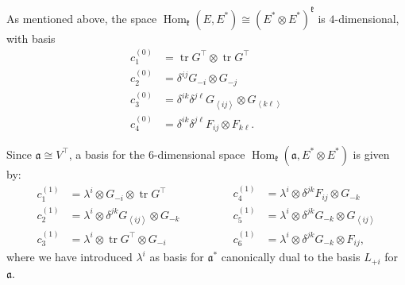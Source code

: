 \documentclass[11pt,reqno,a4paper,final]{amsart}
\theoremstyle{plain}
\theoremstyle{definition}
\newcommand{\fa}{\mathfrak{a}}
\newcommand{\fk}{\mathfrak{k}}
\newcommand{\tr}{\operatorname{tr}}
\newcommand{\1}{\mathbb{1}}
\newcommand{\Hom}{\operatorname{Hom}}
\numberwithin{equation}{section}
\begin{document}
\begin{appendices}
As mentioned above, the space $\Hom_{\fk}(E, E^*) \cong (E^*\otimes
E^*)^\fk$ is $4$-dimensional, with basis
\begin{equation}
  \begin{split}
    c^{(0)}_1 &=\tr G^\top \otimes \tr G^\top\\
    c^{(0)}_2 &= \delta^{ij} G_{-i} \otimes G_{-j}\\
    c^{(0)}_3 &= \delta^{ik}\delta^{j\ell} G_{\left<ij\right>} \otimes G_{\left<k\ell\right>}\\
    c^{(0)}_4 &= \delta^{ik}\delta^{j\ell} F_{ij} \otimes F_{k\ell}.
  \end{split}
\end{equation}

Since $\fa \cong V^\top$, a basis for the $6$-dimensional space
$\Hom_{\fk}(\fa, E^* \otimes E^*)$ is given by:
\begin{equation}
  \begin{aligned}
    c^{(1)}_1 &= \lambda^i \otimes G_{-i} \otimes \tr G^\top\\
    c^{(1)}_2 &= \lambda^i \otimes \delta^{jk} G_{\left<ij\right>} \otimes G_{-k}\\
    c^{(1)}_3 &= \lambda^i \otimes \tr G^\top \otimes G_{-i}
  \end{aligned}
  \qquad\qquad
  \begin{aligned}
    c^{(1)}_4 &= \lambda^i \otimes \delta^{jk} F_{ij} \otimes G_{-k}\\
    c^{(1)}_5 &= \lambda^i \otimes \delta^{jk} G_{-k} \otimes G_{\left<ij\right>}\\
    c^{(1)}_6 &= \lambda^i \otimes \delta^{jk} G_{-k} \otimes F_{ij},
  \end{aligned}
\end{equation}
where we have introduced $\lambda^i$ as basis for $\fa^*$ canonically
dual to the basis $L_{+i}$ for $\fa$.


\end{appendices}
\end{document}
